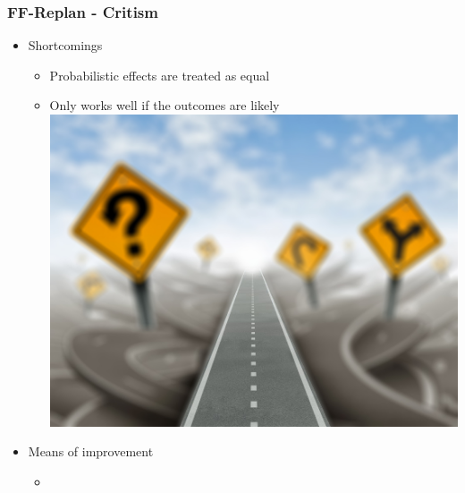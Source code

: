 \documentclass{beamer}
\let\origframetitle=\frametitle
\renewcommand\frametitle[1]{\origframetitle{\textbf{\large{\textrm{#1}}}}}
\begin{document}
\begin{frame}
  \frametitle{FF-Replan - Critism}

  \begin{itemize}
    \item Shortcomings
      \begin{itemize}
        \item Probabilistic effects are treated as equal
        \item Only works well if the outcomes are likely
          \includegraphics[scale=0.01]{images/direction-road-maze.jpg}
      \end{itemize}
    \item Means of improvement
      \begin{itemize}
        \item
      \end{itemize}
   \end{itemize}
\end{frame}
\end{document}
